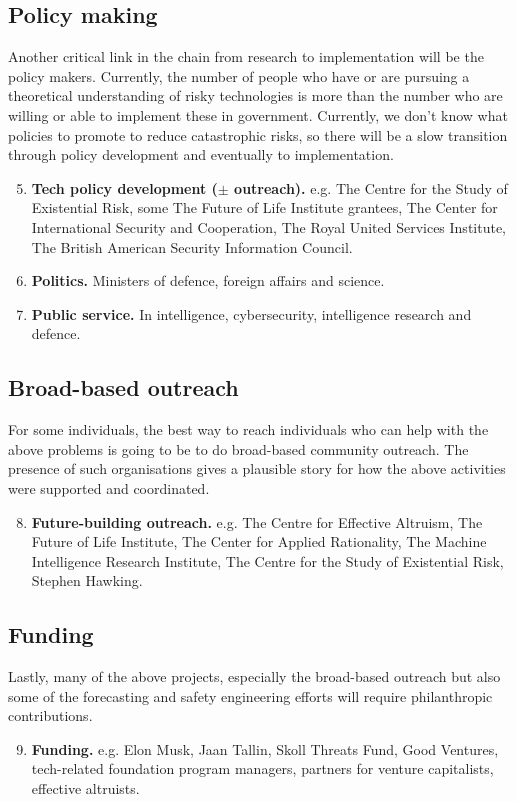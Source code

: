 \documentclass[12pt]{article}
\begin{document}
\subsection*{Policy making}
Another critical link in the chain from research to implementation will be the policy makers. Currently, the number of people who have or are pursuing a theoretical understanding of risky technologies is more than the number who are willing or able to implement these in government. Currently, we don't know what policies to promote to reduce catastrophic risks, so there will be a slow transition through policy development and eventually to implementation.
\begin{enumerate}[label=\textbf{\arabic*})]
        \setcounter{enumi}{4}
    \item {\bfseries Tech policy development (\(\pm\) outreach).} e.g. The Centre for the Study of Existential Risk, some The Future of Life Institute grantees, The Center for International Security and Cooperation, The Royal United Services Institute, The British American Security Information Council.
\item {\bfseries Politics.} Ministers of defence, foreign affairs and science.
        \item {\bfseries Public service.} In intelligence, cybersecurity, intelligence research and defence.
\end{enumerate}

\subsection*{Broad-based outreach}
For some individuals, the best way to reach individuals who can help with the above problems is going to be to do broad-based community outreach. The presence of such organisations gives a plausible story for how the above activities were supported and coordinated.
\begin{enumerate}[label=\textbf{\arabic*})]
        \setcounter{enumi}{7}
\item {\bfseries Future-building outreach.} e.g. The Centre for Effective Altruism, The Future of Life Institute, The Center for Applied Rationality, The Machine Intelligence Research Institute, The Centre for the Study of Existential Risk, Stephen Hawking.
\end{enumerate}

\subsection*{Funding}
Lastly, many of the above projects, especially the broad-based outreach but also some of the forecasting and safety engineering efforts will require philanthropic contributions.
\begin{enumerate}[label=\textbf{\arabic*})]
        \setcounter{enumi}{8}
    \item {\bfseries Funding.} e.g. Elon Musk, Jaan Tallin, Skoll Threats Fund, Good Ventures, tech-related foundation program managers, partners for venture capitalists, effective altruists.
\end{enumerate}
\end{document}
